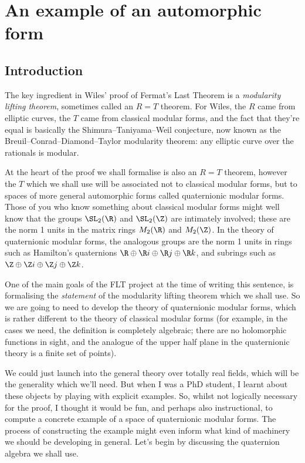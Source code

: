 \chapter{An example of an automorphic form}

\section{Introduction}

The key ingredient in Wiles' proof of Fermat's Last Theorem is a \emph{modularity lifting theorem},
sometimes called an $R=T$ theorem. For Wiles, the $R$ came from elliptic curves, the $T$ came from
classical modular forms, and the fact that they're equal is basically the Shimura--Taniyama--Weil
conjecture, now known as the Breuil--Conrad--Diamond--Taylor modularity theorem: any elliptic
curve over the rationals is modular.

At the heart of the proof we shall formalise is also an $R=T$ theorem, however the $T$ which we
shall use will be associated not to classical modular forms, but to spaces of more general
automorphic forms called quaternionic modular forms. Those of you who know something about
classical modular forms might well know that the groups $\SL_2(\R)$ and $\SL_2(\Z)$ are
intimately involved; these are the norm 1 units in the matrix rings $M_2(\R)$ and $M_2(\Z)$.
In the theory of quaternionic modular forms, the analogous groups are the norm 1 units
in rings such as Hamilton's quaternions $\R\oplus\R i\oplus\R j\oplus\R k$, and subrings
such as $\Z\oplus\Z i\oplus\Z j\oplus\Z k$.

One of the main goals of the FLT project at the time of writing this sentence, is formalising
the \emph{statement} of the modularity lifting theorem which we shall use. So we are going
to need to develop the theory of quaternionic modular forms, which is rather different
to the theory of classical modular forms (for example, in the cases we need, the definition
is completely algebraic; there are no holomorphic functions in sight, and the analogue
of the upper half plane in the quaternionic theory is a finite set of points).

We could just launch into the general theory over totally real fields, which will be the generality
which we'll need. But when I was a PhD student, I learnt about
these objects by playing with explicit examples. So, whilst not logically necessary for the proof,
I thought it would be fun, and perhaps also instructional, to compute a concrete example of a space
of quaternionic modular forms. The process of constructing the example might even inform what kind
of machinery we should be developing in general. Let's begin by discussing the quaternion algebra
we shall use.

